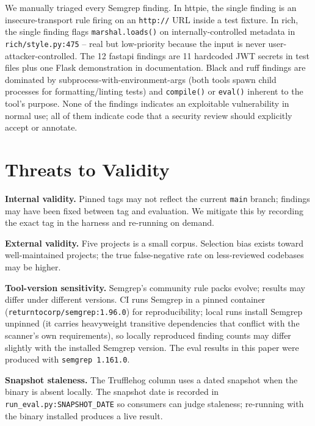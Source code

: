 \documentclass[conference]{IEEEtran}
\begin{document}
We manually triaged every Semgrep finding. In httpie, the single finding
is an insecure-transport rule firing on an \texttt{http://} URL inside
a test fixture. In rich, the single finding flags
\texttt{marshal.loads()} on internally-controlled metadata in
\texttt{rich/style.py:475} -- real but low-priority because the input
is never user-attacker-controlled. The 12 fastapi findings are 11
hardcoded JWT secrets in test files plus one Flask demonstration in
documentation. Black and ruff findings are dominated by
subprocess-with-environment-args (both tools spawn child processes for
formatting/linting tests) and \texttt{compile()} or \texttt{eval()}
inherent to the tool's purpose. None of the findings indicates an
exploitable vulnerability in normal use; all of them indicate code that
a security review should explicitly accept or annotate.

\section{Threats to Validity}

\textbf{Internal validity.} Pinned tags may not reflect the current
\texttt{main} branch; findings may have been fixed between tag and
evaluation. We mitigate this by recording the exact tag in the harness
and re-running on demand.

\textbf{External validity.} Five projects is a small corpus. Selection
bias exists toward well-maintained projects; the true false-negative rate
on less-reviewed codebases may be higher.

\textbf{Tool-version sensitivity.} Semgrep's community rule packs evolve;
results may differ under different versions. CI runs Semgrep in a pinned
container (\texttt{returntocorp/semgrep:1.96.0}) for reproducibility;
local runs install Semgrep unpinned (it carries heavyweight transitive
dependencies that conflict with the scanner's own requirements), so
locally reproduced finding counts may differ slightly with the installed
Semgrep version. The eval results in this paper were produced with
\texttt{semgrep 1.161.0}.

\textbf{Snapshot staleness.} The Trufflehog column uses a dated snapshot
when the binary is absent locally. The snapshot date is recorded in
\texttt{run\_eval.py:SNAPSHOT\_DATE} so consumers can judge staleness;
re-running with the binary installed produces a live result.

\end{document}
